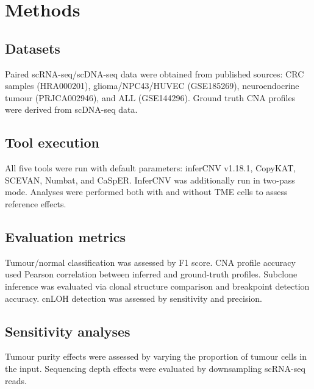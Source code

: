\documentclass[11pt]{article}
\begin{document}
\section{Methods}

\subsection{Datasets}
Paired scRNA-seq/scDNA-seq data were obtained from published sources: CRC samples (HRA000201), glioma/NPC43/HUVEC (GSE185269), neuroendocrine tumour (PRJCA002946), and ALL (GSE144296). Ground truth CNA profiles were derived from scDNA-seq data.

\subsection{Tool execution}
All five tools were run with default parameters: inferCNV v1.18.1, CopyKAT, SCEVAN, Numbat, and CaSpER. InferCNV was additionally run in two-pass mode. Analyses were performed both with and without TME cells to assess reference effects.

\subsection{Evaluation metrics}
Tumour/normal classification was assessed by F1 score. CNA profile accuracy used Pearson correlation between inferred and ground-truth profiles. Subclone inference was evaluated via clonal structure comparison and breakpoint detection accuracy. cnLOH detection was assessed by sensitivity and precision.

\subsection{Sensitivity analyses}
Tumour purity effects were assessed by varying the proportion of tumour cells in the input. Sequencing depth effects were evaluated by downsampling scRNA-seq reads.


\end{document}

